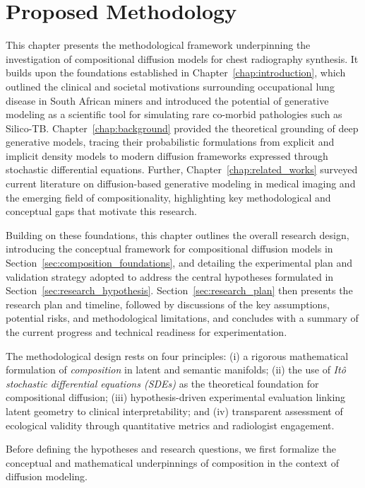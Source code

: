 \chapter{Proposed Methodology}
\label{chap:methodology}

\noindent
This chapter presents the methodological framework underpinning the investigation of compositional diffusion models for chest radiography synthesis.  
It builds upon the foundations established in Chapter~\ref{chap:introduction}, which outlined the clinical and societal motivations surrounding occupational lung disease in South African miners and introduced the potential of generative modeling as a scientific tool for simulating rare co-morbid pathologies such as Silico-TB.  
Chapter~\ref{chap:background} provided the theoretical grounding of deep generative models, tracing their probabilistic formulations from explicit and implicit density models to modern diffusion frameworks expressed through stochastic differential equations.  
Further, Chapter~\ref{chap:related_works} surveyed current literature on diffusion-based generative modeling in medical imaging and the emerging field of compositionality, highlighting key methodological and conceptual gaps that motivate this research.  

Building on these foundations, this chapter outlines the overall research design, introducing the conceptual framework for compositional diffusion models in Section~\ref{sec:composition_foundations}, and detailing the experimental plan and validation strategy adopted to address the central hypotheses formulated in Section~\ref{sec:research_hypothesis}.  
Section~\ref{sec:research_plan} then presents the research plan and timeline, followed by discussions of the key assumptions, potential risks, and methodological limitations, and concludes with a summary of the current progress and technical readiness for experimentation.  

The methodological design rests on four principles: (i) a rigorous mathematical formulation of \emph{composition} in latent and semantic manifolds; (ii) the use of \emph{Itô stochastic differential equations (SDEs)} as the theoretical foundation for compositional diffusion; (iii) hypothesis-driven experimental evaluation linking latent geometry to clinical interpretability; and (iv) transparent assessment of ecological validity through quantitative metrics and radiologist engagement.  

Before defining the hypotheses and research questions, we first formalize the conceptual and mathematical underpinnings of composition in the context of diffusion modeling.



